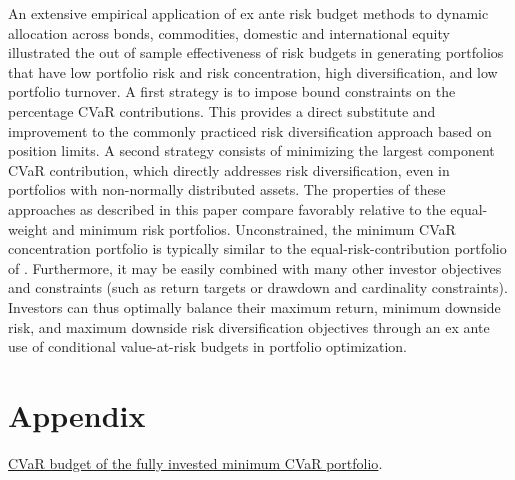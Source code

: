 \documentclass[12pt,a4paper]{article}
\begin{document}
An extensive empirical application of ex ante risk budget methods to dynamic allocation across bonds, commodities, domestic and international equity illustrated the out of sample effectiveness of risk budgets in generating portfolios that have low portfolio risk and risk concentration, high diversification, and low portfolio turnover. A first strategy is to impose bound constraints on the percentage CVaR contributions. This provides a direct substitute and improvement to the commonly practiced risk diversification approach based on position limits. A second strategy consists of minimizing the largest component CVaR contribution, which directly addresses risk diversification, even in portfolios with non-normally distributed assets. The properties of these approaches as described in this paper compare favorably relative to the equal-weight and minimum risk portfolios. Unconstrained, the minimum CVaR concentration  portfolio is typically similar to the equal-risk-contribution portfolio of \citet{Qian2005}. Furthermore, it may be easily combined with many other investor objectives and constraints (such as return targets or drawdown and cardinality constraints). Investors can thus optimally balance their maximum return, minimum downside risk, and maximum downside risk diversification objectives through an ex ante use of conditional value-at-risk  budgets in portfolio optimization.

\newpage

\section{Appendix \label{sec:Appendix}}

\noindent \underline{CVaR budget of the fully invested minimum CVaR portfolio}.
\end{document}
